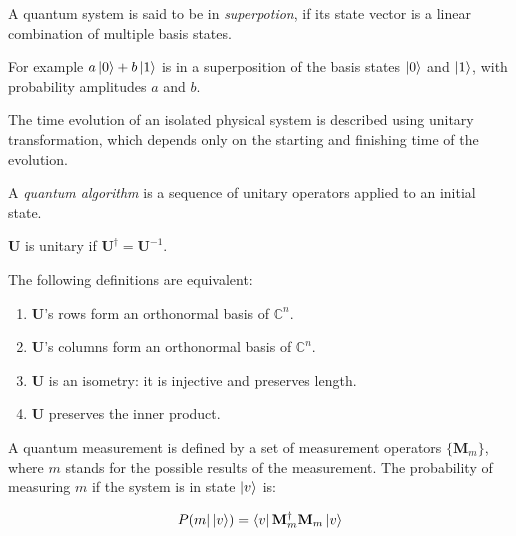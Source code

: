 \begin{definition}[Superposition]

A quantum system is said to be in \textit{superpotion}, if its state vector is a linear combination of multiple basis states.

For example $a\ket{0} + b\ket{1}$ is in a superposition of the basis states $\ket{0}$ and $\ket{1}$, with probability amplitudes $a$ and $b$.

\end{definition}


The time evolution of an isolated physical system is described using unitary transformation, which depends only on the starting and finishing time of the evolution.

A \textit{quantum algorithm} is a sequence of unitary operators applied to an initial state.

\begin{definition}

$\mathbf{U}$ is unitary if $\mathbf{U}^{\dagger} = \mathbf{U}^{-1}$.


The following definitions are equivalent:

\begin{enumerate}
    \item $\mathbf{U}$'s rows form an orthonormal basis of $\mathds{C}^n$.
    \item $\mathbf{U}$'s columns form an orthonormal basis of $\mathds{C}^n$.
    \item $\mathbf{U}$ is an isometry: it is injective and preserves length.
    \item $\mathbf{U}$ preserves the inner product.
\end{enumerate}

\end{definition}


A quantum measurement is defined by a set of measurement operators $\{\mathbf{M}_m\}$, where $m$ stands for the possible results of the measurement. The probability of measuring $m$ if the system is in state $\ket{v}$ is:

\begin{align*}
    P(m | \ket{v}) = \bra{v} \mathbf{M}_m^{\dagger} \mathbf{M}_m \ket{v}
\end{align*}

